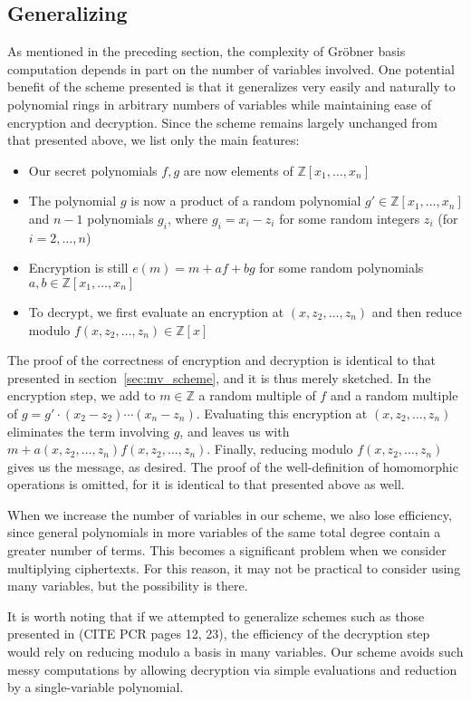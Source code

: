 \documentclass[11pt]{report}
\newcommand{\Z}{\mathbb{Z}}
\newcommand{\Zx}{\mathbb{Z}[x]}
\newcommand{\Zxn}{\mathbb{Z}[x_1,\ldots,x_n]}
\begin{document}
\subsection{Generalizing}
\label{sec:mv_generalizing}
As mentioned in the preceding section, the complexity of Gr\"obner basis computation depends in part on the number of variables involved. One potential benefit of the scheme presented is that it generalizes very easily and naturally to polynomial rings in arbitrary numbers of variables while maintaining ease of encryption and decryption. Since the scheme remains largely unchanged from that presented above, we list only the main features:

\begin{itemize}
\item Our secret polynomials $f,g$ are now elements of $\Zxn$
\item The polynomial $g$ is now a product of a random polynomial $g'\in \Zxn$ and $n-1$ polynomials $g_i$, where $g_i=x_i-z_i$ for some random integers $z_i$ (for $i=2,\dots,n$)
\item Encryption is still $e(m)=m+af+bg$ for some random polynomials $a,b\in \Zxn$
\item To decrypt, we first evaluate an encryption at $(x,z_2,\dots,z_n)$ and then reduce modulo $f(x,z_2,\dots,z_n) \in \Zx$
\end{itemize}

The proof of the correctness of encryption and decryption is identical to that presented in section~\ref{sec:mv_scheme}, and it is thus merely sketched. In the encryption step, we add to $m\in \Z$ a random multiple of $f$ and a random multiple of $g=g'\cdot(x_2-z_2)\cdots(x_n-z_n)$. Evaluating this encryption at $(x,z_2,\dots,z_n)$ eliminates the term involving $g$, and leaves us with $m+a(x,z_2,\dots,z_n)f(x,z_2,\dots,z_n)$. Finally, reducing modulo $f(x,z_2,\dots,z_n)$ gives us the message, as desired. The proof of the well-definition of homomorphic operations is omitted, for it is identical to that presented above as well.

When we increase the number of variables in our scheme, we also lose efficiency, since general polynomials in more variables of the same total degree contain a greater number of terms. This becomes a significant problem when we consider multiplying ciphertexts. For this reason, it may not be practical to consider using many variables, but the possibility is there.

It is worth noting that if we attempted to generalize schemes such as those presented in (CITE PCR pages 12, 23), the efficiency of the decryption step would rely on reducing modulo a basis in many variables. Our scheme avoids such messy computations by allowing decryption via simple evaluations and reduction by a single-variable polynomial.
\end{document}
